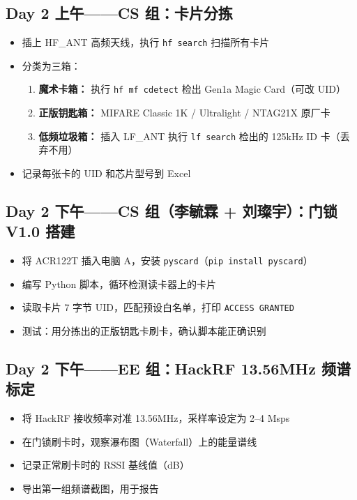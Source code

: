 \documentclass[12pt,a4paper]{ctexart}
\begin{document}
\subsection*{Day 2 上午——CS 组：卡片分拣}
\begin{itemize}[nosep]
    \item 插上 HF\_ANT 高频天线，执行 \texttt{hf search} 扫描所有卡片
    \item 分类为三箱：
    \begin{enumerate}[nosep,label=(\arabic*)]
        \item \textbf{魔术卡箱：} 执行 \texttt{hf mf cdetect} 检出 Gen1a Magic Card（可改 UID）
        \item \textbf{正版钥匙箱：} MIFARE Classic 1K / Ultralight / NTAG21X 原厂卡
        \item \textbf{低频垃圾箱：} 插入 LF\_ANT 执行 \texttt{lf search} 检出的 125kHz ID 卡（丢弃不用）
    \end{enumerate}
    \item 记录每张卡的 UID 和芯片型号到 Excel
\end{itemize}

\subsection*{Day 2 下午——CS 组（李毓霖 + 刘璨宇）：门锁 V1.0 搭建}
\begin{itemize}[nosep]
    \item 将 ACR122T 插入电脑 A，安装 \texttt{pyscard}（\texttt{pip install pyscard}）
    \item 编写 Python 脚本，循环检测读卡器上的卡片
    \item 读取卡片 7 字节 UID，匹配预设白名单，打印 \texttt{ACCESS GRANTED}
    \item 测试：用分拣出的正版钥匙卡刷卡，确认脚本能正确识别
\end{itemize}

\subsection*{Day 2 下午——EE 组：HackRF 13.56MHz 频谱标定}
\begin{itemize}[nosep]
    \item 将 HackRF 接收频率对准 13.56MHz，采样率设定为 2--4 Msps
    \item 在门锁刷卡时，观察瀑布图（Waterfall）上的能量谱线
    \item 记录正常刷卡时的 RSSI 基线值（dB）
    \item 导出第一组频谱截图，用于报告
\end{itemize}
\end{document}

